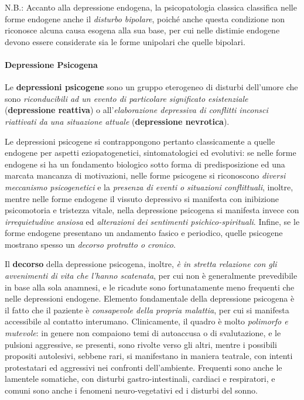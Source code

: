 N.B.: Accanto alla depressione endogena, la psicopatologia classica
classifica nelle forme endogene anche il \emph{disturbo bipolare},
poiché anche questa condizione non riconosce alcuna causa esogena alla
sua base, per cui nelle distimie endogene devono essere considerate sia
le forme unipolari che quelle bipolari.

\paragraph{Depressione Psicogena}

Le \textbf{depressioni psicogene} sono un gruppo eterogeneo di disturbi
dell'umore che sono \emph{riconducibili ad un evento di particolare
significato esistenziale} (\textbf{depressione reattiva}) o
all'\emph{elaborazione depressiva di conflitti inconsci riattivati da
una situazione attuale} (\textbf{depressione nevrotica}).

Le depressioni psicogene si contrappongono pertanto classicamente a
quelle endogene per aspetti eziopatogenetici, sintomatologici ed
evolutivi: se nelle forme endogene si ha un fondamento biologico sotto
forma di predisposizione ed una marcata mancanza di motivazioni, nelle
forme psicogene si riconoscono \emph{diversi meccanismo psicogenetici} e
la \emph{presenza di eventi o situazioni conflittuali}, inoltre, mentre
nelle forme endogene il vissuto depressivo si manifesta con inibizione
psicomotoria e tristezza vitale, nella depressione psicogena si
manifesta invece con \emph{irrequietudine ansiosa} ed \emph{alterazioni
dei sentimenti psichico-spirituali}. Infine, se le forme endogene
presentano un andamento fasico e periodico, quelle psicogene mostrano
spesso un \emph{decorso protratto o cronico}.

Il \textbf{decorso} della depressione psicogena, inoltre, \emph{è in
stretta relazione con gli avvenimenti di vita che l'hanno scatenata},
per cui non è generalmente prevedibile in base alla sola anamnesi, e le
ricadute sono fortunatamente meno frequenti che nelle depressioni
endogene. Elemento fondamentale della depressione psicogena è il fatto
che il paziente è \emph{consapevole della propria malattia}, per cui si
manifesta accessibile al contatto interumano. Clinicamente, il quadro è
molto \emph{polimorfo e mutevole}: in genere non compaiono temi di
autoaccusa o di svalutazione, e le pulsioni aggressive, se presenti,
sono rivolte verso gli altri, mentre i possibili propositi autolesivi,
sebbene rari, si manifestano in maniera teatrale, con intenti
protestatari ed aggressivi nei confronti dell'ambiente. Frequenti sono
anche le lamentele somatiche, con disturbi gastro-intestinali, cardiaci
e respiratori, e comuni sono anche i fenomeni neuro-vegetativi ed i
disturbi del sonno.

